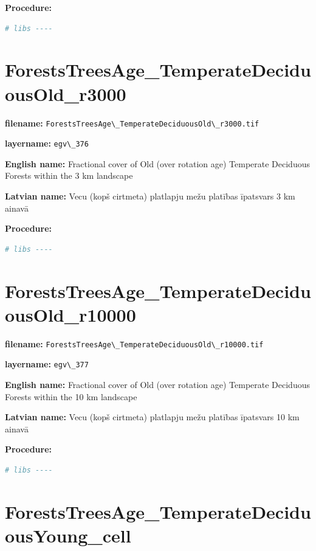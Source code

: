 \documentclass[
]{book}
\newcommand{\passthrough}[1]{#1}
\begin{document}
\textbf{Procedure:}

\begin{lstlisting}[language=R]
# libs ----
\end{lstlisting}

\section{ForestsTreesAge\_TemperateDeciduousOld\_r3000}\label{ch06.376}

\textbf{filename:} \passthrough{\lstinline!ForestsTreesAge\_TemperateDeciduousOld\_r3000.tif!}

\textbf{layername:} \passthrough{\lstinline!egv\_376!}

\textbf{English name:} Fractional cover of Old (over rotation age) Temperate Deciduous Forests within the 3 km landscape

\textbf{Latvian name:} Vecu (kopš cirtmeta) platlapju mežu platības īpatsvars 3 km ainavā

\textbf{Procedure:}

\begin{lstlisting}[language=R]
# libs ----
\end{lstlisting}

\section{ForestsTreesAge\_TemperateDeciduousOld\_r10000}\label{ch06.377}

\textbf{filename:} \passthrough{\lstinline!ForestsTreesAge\_TemperateDeciduousOld\_r10000.tif!}

\textbf{layername:} \passthrough{\lstinline!egv\_377!}

\textbf{English name:} Fractional cover of Old (over rotation age) Temperate Deciduous Forests within the 10 km landscape

\textbf{Latvian name:} Vecu (kopš cirtmeta) platlapju mežu platības īpatsvars 10 km ainavā

\textbf{Procedure:}

\begin{lstlisting}[language=R]
# libs ----
\end{lstlisting}

\section{ForestsTreesAge\_TemperateDeciduousYoung\_cell}\label{ch06.378}
\end{document}

